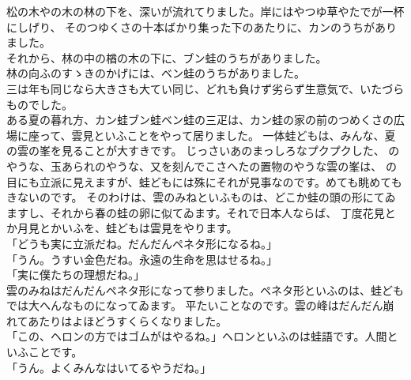 \documentclass[
a4paper,
10pt,
book]
{tarticle}
\begin{document}
\begin{linenumbers}
    \indent 松の木やの木の林の下を、深いが流れてりました。岸にはやつゆ草やたでが一杯にしげり、
    そのつゆくさの十本ばかり集った下のあたりに、カンのうちがありました。\\
    \indent それから、林の中の楢の木の下に、ブン蛙のうちがありました。\\
    \indent 林の向ふのすゝきのかげには、ベン蛙のうちがありました。\\
    \indent 三は年も同じなら大きさも大てい同じ、どれも負けず劣らず生意気で、いたづらものでした。\\
    \indent ある夏の暮れ方、カン蛙ブン蛙ベン蛙の三疋は、カン蛙の家の前のつめくさの広場に座って、雲見といふことをやって居りました。
    一体蛙どもは、みんな、夏の雲の峯を見ることが大すきです。
    じっさいあのまっしろなプクプクした、
    のやうな、玉あられのやうな、又を刻んでこさへたの置物のやうな雲の峯は、
    の目にも立派に見えますが、蛙どもには殊にそれが見事なのです。めても眺めてもきないのです。
    そのわけは、雲のみねといふものは、どこか蛙の頭の形にてゐますし、それから春の蛙の卵に似てゐます。それで日本人ならば、
    丁度花見とか月見とかいふを、蛙どもは雲見をやります。\\
    「どうも実に立派だね。だんだんペネタ形になるね。」\\
    「うん。うすい金色だね。永遠の生命を思はせるね。」\\
    「実に僕たちの理想だね。」\\
    \indent 雲のみねはだんだんペネタ形になって参りました。ペネタ形といふのは、蛙どもでは大へんなものになってゐます。
    平たいことなのです。雲の峰はだんだん崩れてあたりはよほどうすくらくなりました。\\
    「この、ヘロンの方ではゴムがはやるね。」ヘロンといふのは蛙語です。人間といふことです。\\
    「うん。よくみんなはいてるやうだね。」
\end{linenumbers}
\end{document}
